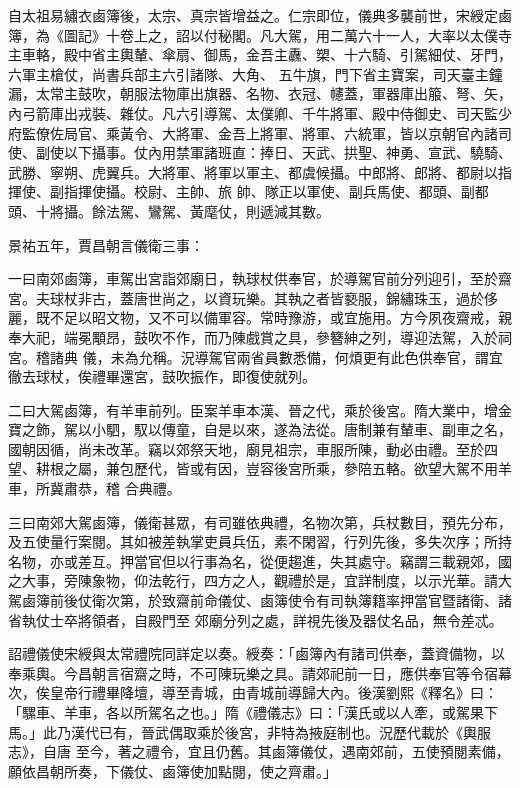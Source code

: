 \begin{pinyinscope}
 自太祖易繡衣鹵簿後，太宗、真宗皆增益之。仁宗即位，儀典多襲前世，宋綬定鹵簿，為《圖記》十卷上之，詔以付秘閣。凡大駕，用二萬六十一人，大率以太僕寺主車輅，殿中省主輿輦、傘扇、御馬，金吾主纛、槊、十六騎、引駕細仗、牙門，六軍主槍仗，尚書兵部主六引諸隊、大角、
 五牛旗，門下省主寶案，司天臺主鐘漏，太常主鼓吹，朝服法物庫出旗器、名物、衣冠、幰蓋，軍器庫出箙、弩、矢，內弓箭庫出戎裝、雜仗。凡六引導駕、太僕卿、千牛將軍、殿中侍御史、司天監少府監僚佐局官、乘黃令、大將軍、金吾上將軍、將軍、六統軍，皆以京朝官內諸司使、副使以下攝事。仗內用禁軍諸班直：捧日、天武、拱聖、神勇、宣武、驍騎、武勝、寧朔、虎翼兵。大將軍、將軍以軍主、都虞候攝。中郎將、郎將、都尉以指揮使、副指揮使攝。校尉、主帥、旅
 帥、隊正以軍使、副兵馬使、都頭、副都頭、十將攝。餘法駕、鸞駕、黃麾仗，則遞減其數。



 景祐五年，賈昌朝言儀衛三事：



 一曰南郊鹵簿，車駕出宮詣郊廟日，執球杖供奉官，於導駕官前分列迎引，至於齋宮。夫球杖非古，蓋唐世尚之，以資玩樂。其執之者皆褻服，錦繡珠玉，過於侈麗，既不足以昭文物，又不可以備軍容。常時豫游，或宜施用。方今夙夜齋戒，親奉大祀，端冕顒昂，鼓吹不作，而乃陳戲賞之具，參簪紳之列，導迎法駕，入於祠宮。稽諸典
 儀，未為允稱。況導駕官兩省員數悉備，何煩更有此色供奉官，謂宜徹去球杖，俟禮畢還宮，鼓吹振作，即復使就列。



 二曰大駕鹵簿，有羊車前列。臣案羊車本漢、晉之代，乘於後宮。隋大業中，增金寶之飾，駕以小駟，馭以傳童，自是以來，遂為法從。唐制兼有輦車、副車之名，國朝因循，尚未改革。竊以郊祭天地，廟見祖宗，車服所陳，動必由禮。至於四望、耕根之屬，兼包歷代，皆或有因，豈容後宮所乘，參陪五輅。欲望大駕不用羊車，所冀肅恭，稽
 合典禮。



 三曰南郊大駕鹵簿，儀衛甚眾，有司雖依典禮，名物次第，兵杖數目，預先分布，及五使量行案閱。其如被差執掌吏員兵伍，素不閑習，行列先後，多失次序；所持名物，亦或差互。押當官但以行事為名，從便趨進，失其處守。竊謂三載親郊，國之大事，旁陳象物，仰法乾行，四方之人，觀禮於是，宜詳制度，以示光華。請大駕鹵簿前後仗衛次第，於致齋前命儀仗、鹵簿使令有司執簿籍率押當官暨諸衛、諸省執仗士卒將領者，自殿門至
 郊廟分列之處，詳視先後及器仗名品，無令差忒。



 詔禮儀使宋綬與太常禮院同詳定以奏。綬奏：「鹵簿內有諸司供奉，蓋資備物，以奉乘輿。今昌朝言宿齋之時，不可陳玩樂之具。請郊祀前一日，應供奉官等令宿幕次，俟皇帝行禮畢降壇，導至青城，由青城前導歸大內。後漢劉熙《釋名》曰：「騾車、羊車，各以所駕名之也。」隋《禮儀志》曰：「漢氏或以人牽，或駕果下馬。」此乃漢代已有，晉武偶取乘於後宮，非特為掖庭制也。況歷代載於《輿服志》，自唐
 至今，著之禮令，宜且仍舊。其鹵簿儀仗，遇南郊前，五使預閱素備，願依昌朝所奏，下儀仗、鹵簿使加點閱，使之齊肅。」




\end{pinyinscope}
